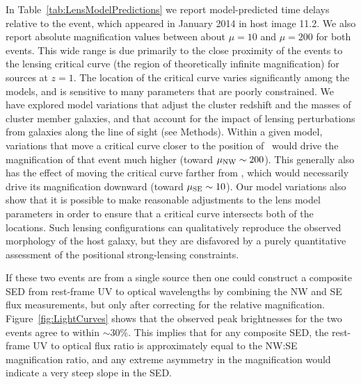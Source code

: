 In Table~\ref{tab:LensModelPredictions} we report model-predicted time
delays relative to the \spockone event, which appeared in January 2014
in host image 11.2.  We also report absolute magnification values
between about $\mu=10$ and $\mu=200$ for both events. This wide range
is due primarily to the close proximity of the \spock events to the
lensing critical curve (the region of theoretically infinite
magnification) for sources at $z=1$.  The location of the critical
curve varies significantly among the models, and is sensitive to many
parameters that are poorly constrained.  We have explored model
variations that adjust the cluster redshift and the masses of cluster
member galaxies, and that account for the impact of lensing
perturbations from galaxies along the line of sight (see Methods).
Within a given model, variations that move a critical curve closer to
the position of \spockone\ would drive the magnification of that event
much higher (toward $\mu_{\rm NW}\sim200$).  This generally also has
the effect of moving the critical curve farther from \spocktwo, which
would necessarily drive its magnification downward (toward $\mu_{\rm
  SE}\sim10$).  Our model variations also show that it is possible to
make reasonable adjustments to the lens model parameters in order to
ensure that a critical curve intersects both of the \spock locations.
Such lensing configurations can qualitatively reproduce the observed
morphology of the \spock host galaxy, but they are disfavored by a
purely quantitative assessment of the positional strong-lensing
constraints.

If these two events are from a single source then one could construct
a composite SED from rest-frame UV to optical wavelengths by combining
the NW and SE flux measurements, but only after correcting for the
relative magnification.  Figure~\ref{fig:LightCurves} shows that the
observed peak brightnesses for the two events agree to within
$\sim30\%$.  This implies that for any composite SED, the rest-frame
UV to optical flux ratio is approximately equal to the NW:SE
magnification ratio, and any extreme asymmetry in the magnification
would indicate a very steep slope in the SED.

